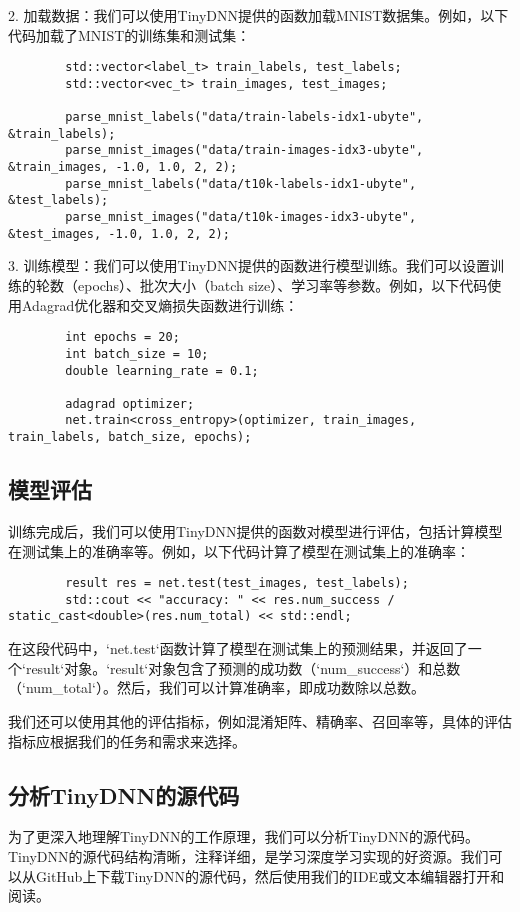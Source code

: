 \documentclass{ctexart}
\begin{document}
        2. 加载数据：我们可以使用TinyDNN提供的函数加载MNIST数据集。例如，以下代码加载了MNIST的训练集和测试集：

        \begin{lstlisting}
        std::vector<label_t> train_labels, test_labels;
        std::vector<vec_t> train_images, test_images;

        parse_mnist_labels("data/train-labels-idx1-ubyte", &train_labels);
        parse_mnist_images("data/train-images-idx3-ubyte", &train_images, -1.0, 1.0, 2, 2);
        parse_mnist_labels("data/t10k-labels-idx1-ubyte", &test_labels);
        parse_mnist_images("data/t10k-images-idx3-ubyte", &test_images, -1.0, 1.0, 2, 2);
        \end{lstlisting}

        3. 训练模型：我们可以使用TinyDNN提供的函数进行模型训练。我们可以设置训练的轮数（epochs）、批次大小（batch size）、学习率等参数。例如，以下代码使用Adagrad优化器和交叉熵损失函数进行训练：

        \begin{lstlisting}
        int epochs = 20;
        int batch_size = 10;
        double learning_rate = 0.1;

        adagrad optimizer;
        net.train<cross_entropy>(optimizer, train_images, train_labels, batch_size, epochs);
        \end{lstlisting}

    \subsection{模型评估}
        训练完成后，我们可以使用TinyDNN提供的函数对模型进行评估，包括计算模型在测试集上的准确率等。例如，以下代码计算了模型在测试集上的准确率：

        \begin{lstlisting}
        result res = net.test(test_images, test_labels);
        std::cout << "accuracy: " << res.num_success / static_cast<double>(res.num_total) << std::endl;
        \end{lstlisting}

        在这段代码中，`net.test`函数计算了模型在测试集上的预测结果，并返回了一个`result`对象。`result`对象包含了预测的成功数（`num\_success`）和总数（`num\_total`）。然后，我们可以计算准确率，即成功数除以总数。

        我们还可以使用其他的评估指标，例如混淆矩阵、精确率、召回率等，具体的评估指标应根据我们的任务和需求来选择。

    \subsection{分析TinyDNN的源代码}
            为了更深入地理解TinyDNN的工作原理，我们可以分析TinyDNN的源代码。TinyDNN的源代码结构清晰，注释详细，是学习深度学习实现的好资源。我们可以从GitHub上下载TinyDNN的源代码，然后使用我们的IDE或文本编辑器打开和阅读。
\end{document}
